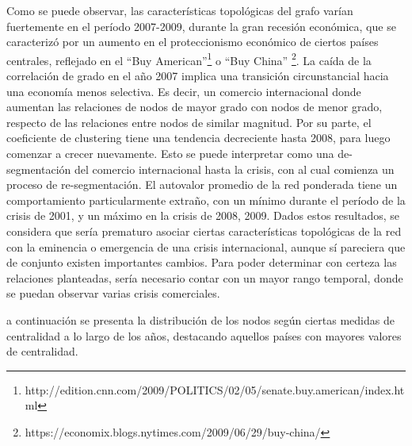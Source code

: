 \documentclass[runningheads,a4paper]{llncs}
\begin{document}
Como se puede observar, las características topológicas del grafo varían fuertemente en el período 2007-2009, durante la gran recesión económica, que se caracterizó por un aumento en el proteccionismo económico de ciertos países centrales, reflejado en el “Buy American”\footnote{http://edition.cnn.com/2009/POLITICS/02/05/senate.buy.american/index.html} o “Buy China” \footnote{https://economix.blogs.nytimes.com/2009/06/29/buy-china/}. 
La caída de la correlación de grado en el año 2007 implica una transición circunstancial hacia una economía menos selectiva. Es decir, un comercio internacional donde aumentan las relaciones de nodos de mayor grado con nodos de menor grado, respecto de las relaciones entre nodos de similar magnitud. 
Por su parte, el coeficiente de clustering tiene una tendencia decreciente hasta 2008, para luego comenzar a crecer nuevamente. Esto se puede interpretar como una de-segmentación del comercio internacional hasta la crisis, con al cual comienza un proceso de re-segmentación. 
El autovalor promedio de la red ponderada tiene un comportamiento particularmente extraño, con un mínimo durante el período de la crisis de 2001, y un máximo en la crisis de 2008, 2009.
Dados estos resultados, se considera que sería prematuro asociar ciertas características topológicas de la red con la eminencia o emergencia de una crisis internacional, aunque sí pareciera que de conjunto existen importantes cambios. Para poder determinar con certeza las relaciones planteadas, sería necesario contar con un mayor rango temporal, donde se puedan observar varias crisis comerciales.


a continuación se presenta la distribución de los nodos según ciertas medidas de centralidad a lo largo de los años, destacando aquellos países con mayores valores de centralidad. 
\end{document}
